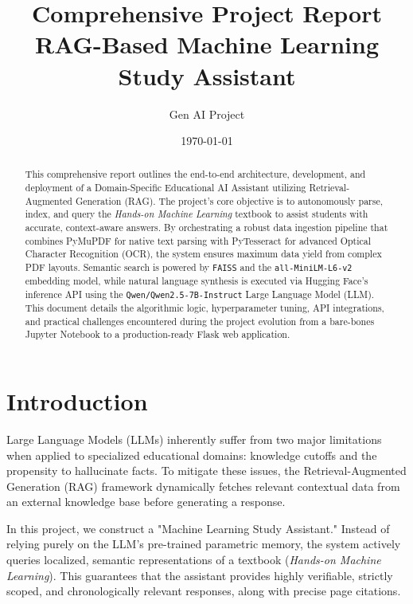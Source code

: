 \documentclass[12pt,a4paper]{article}
\title{\textbf{Comprehensive Project Report}\\ \vspace{0.5cm} \Large \textbf{RAG-Based Machine Learning Study Assistant}}
\author{Gen AI Project}
\date{\today}
\begin{document}
\maketitle
\begin{abstract}
This comprehensive report outlines the end-to-end architecture, development, and deployment of a Domain-Specific Educational AI Assistant utilizing Retrieval-Augmented Generation (RAG). The project’s core objective is to autonomously parse, index, and query the \textit{Hands-on Machine Learning} textbook to assist students with accurate, context-aware answers. By orchestrating a robust data ingestion pipeline that combines PyMuPDF for native text parsing with PyTesseract for advanced Optical Character Recognition (OCR), the system ensures maximum data yield from complex PDF layouts. Semantic search is powered by \texttt{FAISS} and the \texttt{all-MiniLM-L6-v2} embedding model, while natural language synthesis is executed via Hugging Face's inference API using the \texttt{Qwen/Qwen2.5-7B-Instruct} Large Language Model (LLM). This document details the algorithmic logic, hyperparameter tuning, API integrations, and practical challenges encountered during the project evolution from a bare-bones Jupyter Notebook to a production-ready Flask web application.
\end{abstract}

\newpage
\tableofcontents
\newpage

\section{Introduction}
Large Language Models (LLMs) inherently suffer from two major limitations when applied to specialized educational domains: knowledge cutoffs and the propensity to hallucinate facts. To mitigate these issues, the Retrieval-Augmented Generation (RAG) framework dynamically fetches relevant contextual data from an external knowledge base before generating a response. 

In this project, we construct a "Machine Learning Study Assistant." Instead of relying purely on the LLM's pre-trained parametric memory, the system actively queries localized, semantic representations of a textbook (\textit{Hands-on Machine Learning}). This guarantees that the assistant provides highly verifiable, strictly scoped, and chronologically relevant responses, along with precise page citations.
\end{document}

